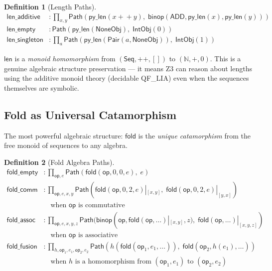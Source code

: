 \documentclass[11pt,a4paper]{report}
\theoremstyle{definition}
\newtheorem{definition}{Definition}[chapter]
\theoremstyle{plain}
\newcommand{\Path}{\mathsf{Path}}
\newcommand{\Nat}{\mathbb{N}}
\newcommand{\fold}{\mathsf{fold}}
\newcommand{\op}{\mathsf{op}}
\begin{document}
\begin{definition}[Length Paths]
\begin{align}
  \mathsf{len\_additive} &: \prod_{x,y}
    \Path(\mathsf{py\_len}(x +\!\!+ y),\;
          \mathsf{binop}(\mathsf{ADD}, \mathsf{py\_len}(x),
          \mathsf{py\_len}(y)))
    \tag{S10} \\
  \mathsf{len\_empty} &:
    \Path(\mathsf{py\_len}(\mathsf{NoneObj}),\; \mathsf{IntObj}(0))
    \tag{S11} \\
  \mathsf{len\_singleton} &: \prod_a
    \Path(\mathsf{py\_len}(\mathsf{Pair}(a, \mathsf{NoneObj})),\;
          \mathsf{IntObj}(1))
    \tag{S12}
\end{align}
\end{definition}

$\mathsf{len}$ is a \emph{monoid homomorphism} from
$(\mathsf{Seq}, +\!\!+, [])$ to $(\Nat, +, 0)$.  This is a genuine
algebraic structure preservation --- it means Z3 can reason about
lengths using the additive monoid theory (decidable QF\_LIA) even
when the sequences themselves are symbolic.

\subsection{Fold as Universal Catamorphism}

The most powerful algebraic structure: $\fold$ is the
\emph{unique catamorphism} from the free monoid of sequences to
any algebra.

\begin{definition}[Fold Algebra Paths]
\label{def:fold-algebra}
\begin{align}
  \mathsf{fold\_empty} &: \prod_{\op, e}
    \Path(\fold(\op, 0, 0, e),\; e)
    \tag{F1} \\
  \mathsf{fold\_comm} &: \prod_{\op, e, x, y}
    \Path(\fold(\op, 0, 2, e)|_{[x,y]},\;
          \fold(\op, 0, 2, e)|_{[y,x]})
    \tag{F2} \\
  &\quad \text{when $\op$ is commutative} \nonumber \\
  \mathsf{fold\_assoc} &: \prod_{\op, e, x, y, z}
    \Path(\mathsf{binop}(\op, \fold(\op, \ldots)|_{[x,y]}, z),\;
          \fold(\op, \ldots)|_{[x,y,z]})
    \tag{F3} \\
  &\quad \text{when $\op$ is associative} \nonumber \\
  \mathsf{fold\_fusion} &: \prod_{h, \op_1, e_1, \op_2, e_2}
    \Path(h(\fold(\op_1, e_1, \ldots)),\;
          \fold(\op_2, h(e_1), \ldots))
    \tag{F4} \\
  &\quad \text{when $h$ is a homomorphism from $(\op_1, e_1)$ to
    $(\op_2, e_2)$} \nonumber
\end{align}
\end{definition}
\end{document}
